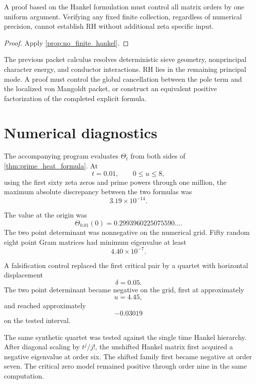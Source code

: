 \documentclass{aomart}
\theoremstyle{definition}
\theoremstyle{remark}
\begin{document}
\begin{corollary}\label{cor:uniformity_essential}
A proof based on the Hankel formulation must control all matrix orders by one uniform argument. Verifying any fixed finite collection, regardless of numerical precision, cannot establish RH without additional zeta specific input.
\end{corollary}

\begin{proof}
Apply \cref{prop:no_finite_hankel}.
\end{proof}

\begin{remark}\label{rem:no_go_meaning}
The previous packet calculus resolves deterministic sieve geometry, nonprincipal character energy, and conductor interactions. RH lies in the remaining principal mode. A proof must control the global cancellation between the pole term and the localized von Mangoldt packet, or construct an equivalent positive factorization of the completed explicit formula.
\end{remark}

\section{Numerical diagnostics}\label{sec:numerics}

The accompanying program evaluates \(\Theta_t\) from both sides of \cref{thm:prime_heat_formula}. At
\[
 t=0.01,
 \qquad
 0\leq u\leq8,
\]
using the first sixty zeta zeros and prime powers through one million, the maximum absolute discrepancy between the two formulas was
\[
 \boxed{3.19\times10^{-14}.}
\]

The value at the origin was
\[
 \Theta_{0.01}(0)
 =0.2993960225075590\ldots.
\]
The two point determinant was nonnegative on the numerical grid. Fifty random eight point Gram matrices had minimum eigenvalue at least
\[
 4.40\times10^{-7}.
\]

A falsification control replaced the first critical pair by a quartet with horizontal displacement
\[
 \delta=0.05.
\]
The two point determinant became negative on the grid, first at approximately
\[
 u=4.45,
\]
and reached approximately
\[
 -0.03019
\]
on the tested interval.

The same synthetic quartet was tested against the single time Hankel hierarchy. After diagonal scaling by \(t^j/j!\), the unshifted Hankel matrix first acquired a negative eigenvalue at order six. The shifted family first became negative at order seven. The critical zero model remained positive through order nine in the same computation.
\end{document}
